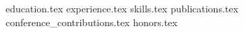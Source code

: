 \documentclass[11pt, a4paper]{awesome-cv}
\newcommand*{\sectiondir}{resume/}
\begin{document}

\makecvheader
% 

{education.tex}
{experience.tex}
{skills.tex}
{publications.tex}
{conference_contributions.tex}
{honors.tex}
\end{document}
